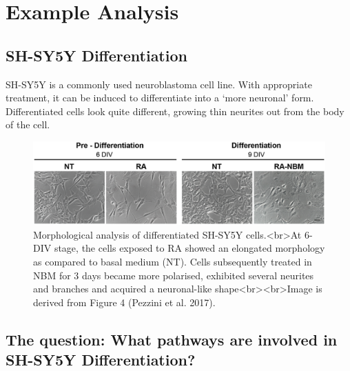 \documentclass[
]{book}
\begin{document}
\hypertarget{section-2}{%
\subsubsection*{}\label{section-2}}

\hypertarget{example-analysis}{%
\chapter{Example Analysis}\label{example-analysis}}

\hypertarget{sh-sy5y-differentiation}{%
\section{SH-SY5Y Differentiation}\label{sh-sy5y-differentiation}}

SH-SY5Y is a commonly used neuroblastoma cell line.
With appropriate treatment, it can be induced to differentiate into a `more neuronal' form.
Differentiated cells look quite different, growing thin neurites out from the body of the cell.

\begin{figure}

{\centering \includegraphics[width=1\linewidth]{images/shsy5ydiff} 

}

\caption{Morphological analysis of differentiated SH-SY5Y cells.<br>At 6-DIV stage, the cells exposed to RA showed an elongated morphology as compared to basal medium (NT). Cells subsequently treated in NBM for 3 days became more polarised, exhibited several neurites and branches and acquired a neuronal-like shape<br><br>Image is derived from Figure 4 (Pezzini et al. 2017).}\label{fig:unnamed-chunk-15}
\end{figure}

\hypertarget{the-question-what-pathways-are-involved-in-sh-sy5y-differentiation}{%
\section{The question: What pathways are involved in SH-SY5Y Differentiation?}\label{the-question-what-pathways-are-involved-in-sh-sy5y-differentiation}}
\end{document}
